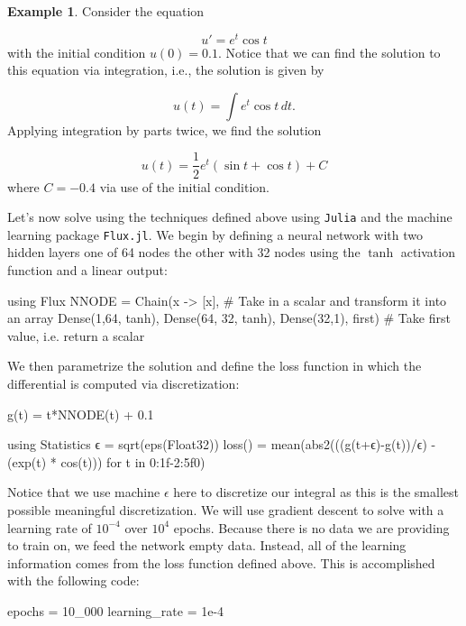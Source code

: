\documentclass{CUP-JNL-DTM}%
\theoremstyle{definition}
\newtheorem{example}[theorem]{Example}
\numberwithin{equation}{section}
\newcommand{\Julia}{\texttt{Julia} }
\begin{document}
\begin{example}
	
Consider the equation

\begin{equation}
	u' = e^t \cos t
\end{equation}
with the initial condition $u(0) = 0.1$. Notice that we can find the solution to this equation via integration, i.e., the solution is given by

\begin{equation}
	u(t) = \int e^t \cos t \, dt. 
\end{equation}
Applying integration by parts twice, we find the solution

\begin{equation}
	u(t) = \frac{1}{2}e^t(\sin t + \cos t) + C
\end{equation}
where $C = -0.4$ via use of the initial condition. 

Let's now solve using the techniques defined above using \Julia and the machine learning package \texttt{Flux.jl}. We begin by defining a neural network with two hidden layers one of 64 nodes the other with 32 nodes using the $\tanh$ activation function and a linear output: 

\begin{jllisting}
using Flux
NNODE = Chain(x -> [x], # Take in a scalar and transform it into an array
           Dense(1,64, tanh),
           Dense(64, 32, tanh),
           Dense(32,1),
           first) # Take first value, i.e. return a scalar
\end{jllisting}
We then parametrize the solution and define the loss function in which the differential is computed via discretization:

\begin{jllisting}
g(t) = t*NNODE(t) + 0.1

using Statistics
ϵ = sqrt(eps(Float32))
loss() = mean(abs2(((g(t+ϵ)-g(t))/ϵ) - (exp(t) * cos(t))) for t in 0:1f-2:5f0)
\end{jllisting}
Notice that we use machine $\epsilon$ here to discretize our integral as this is the smallest possible meaningful discretization. We will use gradient descent to solve with a learning rate of $10^{-4}$ over $10^4$ epochs. Because there is no data we are providing to train on, we feed the network empty data. Instead, all of the learning information comes from the loss function defined above. This is accomplished with the following code:

\begin{jllisting}
epochs = 10_000
learning_rate = 1e-4


\end{jllisting}
\end{example}
\end{document}
